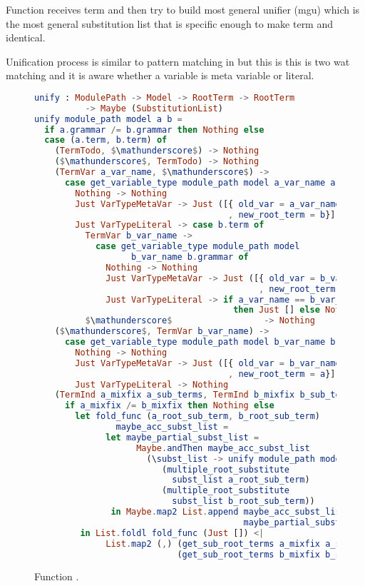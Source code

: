 \documentclass[master.tex]{subfiles}
\begin{document}
Function  receives term  and  then try to build
most general unifier (mgu) which is the most general substitution list that is
specific enough to make term  and  identical.

Unification process is similar to pattern matching in
 but this is this is two wat matching and
it is aware whether a variable is meta variable or literal.

\begin{figure}[H]
\begin{framed}
\begin{lstlisting}[language=elm,basicstyle=\footnotesize\ttfamily]
unify : ModulePath -> Model -> RootTerm -> RootTerm
          -> Maybe (SubstitutionList)
unify module_path model a b =
  if a.grammar /= b.grammar then Nothing else
  case (a.term, b.term) of
    (TermTodo, $\mathunderscore$) -> Nothing
    ($\mathunderscore$, TermTodo) -> Nothing
    (TermVar a_var_name, $\mathunderscore$) ->
      case get_variable_type module_path model a_var_name a.grammar of
        Nothing -> Nothing
        Just VarTypeMetaVar -> Just ([{ old_var = a_var_name
                                      , new_root_term = b}])
        Just VarTypeLiteral -> case b.term of
          TermVar b_var_name ->
            case get_variable_type module_path model
                   b_var_name b.grammar of
              Nothing -> Nothing
              Just VarTypeMetaVar -> Just ([{ old_var = b_var_name
                                            , new_root_term = a}])
              Just VarTypeLiteral -> if a_var_name == b_var_name
                                       then Just [] else Nothing
          $\mathunderscore$                  -> Nothing
    ($\mathunderscore$, TermVar b_var_name) ->
      case get_variable_type module_path model b_var_name b.grammar of
        Nothing -> Nothing
        Just VarTypeMetaVar -> Just ([{ old_var = b_var_name
                                      , new_root_term = a}])
        Just VarTypeLiteral -> Nothing
    (TermInd a_mixfix a_sub_terms, TermInd b_mixfix b_sub_terms) ->
      if a_mixfix /= b_mixfix then Nothing else
        let fold_func (a_root_sub_term, b_root_sub_term)
                maybe_acc_subst_list =
              let maybe_partial_subst_list =
                    Maybe.andThen maybe_acc_subst_list
                      (\subst_list -> unify module_path model
                         (multiple_root_substitute
                           subst_list a_root_sub_term)
                         (multiple_root_substitute
                           subst_list b_root_sub_term))
               in Maybe.map2 List.append maybe_acc_subst_list
                                         maybe_partial_subst_list
         in List.foldl fold_func (Just []) <|
              List.map2 (,) (get_sub_root_terms a_mixfix a_sub_terms)
                            (get_sub_root_terms b_mixfix b_sub_terms)
\end{lstlisting}
\end{framed}
\caption{Function .}
\end{figure}
\end{document}
